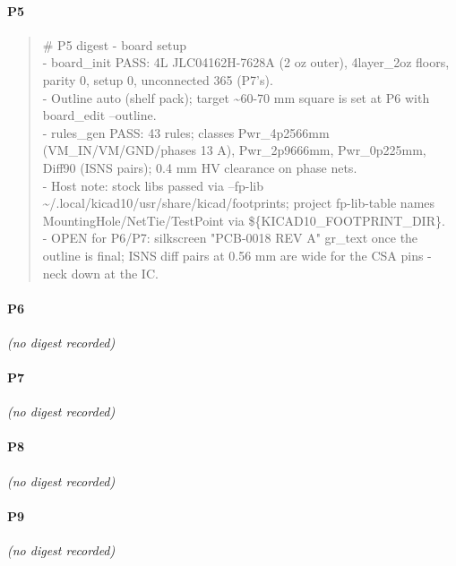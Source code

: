 \documentclass[11pt,a4paper]{article}
\begin{document}
\paragraph*{P5}
\begin{quote}\small\ttfamily\raggedright
\# P5 digest - board setup\\
- board\_init PASS: 4L JLC04162H-7628A (2 oz outer), 4layer\_2oz floors, parity 0, setup 0, unconnected 365 (P7's).\\
- Outline auto (shelf pack); target \textasciitilde{}60-70 mm square is set at P6 with board\_edit --outline.\\
- rules\_gen PASS: 43 rules; classes Pwr\_4p2566mm (VM\_IN/VM/GND/phases 13 A), Pwr\_2p9666mm, Pwr\_0p225mm, Diff90 (ISNS pairs); 0.4 mm HV clearance on phase nets.\\
- Host note: stock libs passed via --fp-lib \textasciitilde{}/.local/kicad10/usr/share/kicad/footprints; project fp-lib-table names MountingHole/NetTie/TestPoint via \$\{KICAD10\_FOOTPRINT\_DIR\}.\\
- OPEN for P6/P7: silkscreen "PCB-0018 REV A" gr\_text once the outline is final; ISNS diff pairs at 0.56 mm are wide for the CSA pins - neck down at the IC.
\end{quote}
\paragraph*{P6}
\emph{(no digest recorded)}
\paragraph*{P7}
\emph{(no digest recorded)}
\paragraph*{P8}
\emph{(no digest recorded)}
\paragraph*{P9}
\emph{(no digest recorded)}
\end{document}
